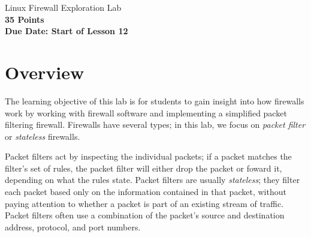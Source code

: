 








\begin{center}
{\LARGE Linux Firewall Exploration Lab}\\
\textbf{35 Points }\\
\textbf{Due Date: Start of Lesson 12}
\end{center}

\copyrightnoticeA

\setcounter{task}{1}
\newcommand{\tasks} {\bf {\noindent (\arabic{task})} \addtocounter{task}{1} \,}


\section{Overview}
The learning objective of this lab is for students to gain  
insight into how firewalls work 
by working with firewall software and implementing a simplified 
packet filtering firewall.
Firewalls have several types; in this lab, we focus on 
{\em packet filter} or {\em stateless} firewalls.%

Packet filters act by inspecting the individual packets;
if a packet matches the filter's set of rules, the packet filter will 
either drop the packet or foward it, depending on what the rules state. 
Packet filters are usually {\em stateless}; they filter each packet based 
only on the information contained in that packet, without paying 
attention to whether a packet is part of an existing stream of traffic.
Packet filters often use a combination of the packet's source and 
destination address, protocol, and port numbers.

